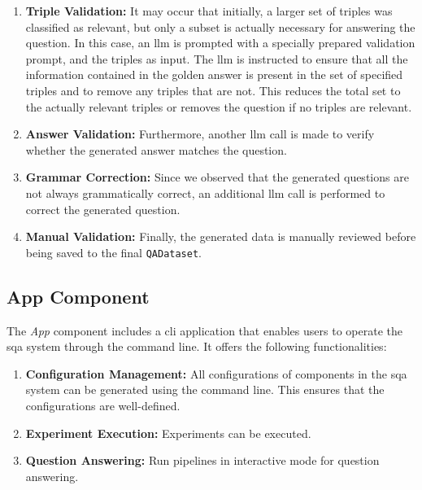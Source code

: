\begin{enumerate}
    \item \textbf{Triple Validation:} It may occur that initially, a larger set of triples was classified as relevant, but only a subset is actually necessary for answering the question. In this case, an \gls{llm} is prompted with a specially prepared validation prompt, and the triples as input. The \gls{llm} is instructed to ensure that all the information contained in the golden answer is present in the set of specified triples and to remove any triples that are not. This reduces the total set to the actually relevant triples or removes the question if no triples are relevant.
    
    \item \textbf{Answer Validation:} Furthermore, another \gls{llm} call is made to verify whether the generated answer matches the question.
    
    \item \textbf{Grammar Correction:} Since we observed that the generated questions are not always grammatically correct, an additional \gls{llm} call is performed to correct the generated question.
    
    \item \textbf{Manual Validation:} Finally, the generated data is manually reviewed before being saved to the final \texttt{QADataset}.
\end{enumerate}

\subsection{App Component}

The \emph{App} component includes a \gls{cli} application that enables users to operate the \gls{sqa} system through the command line. It offers the following functionalities:

\begin{enumerate}
    \item \textbf{Configuration Management:} All configurations of components in the \gls{sqa} system can be generated using the command line. This ensures that the configurations are well-defined.
    \item \textbf{Experiment Execution:} Experiments can be executed.
    \item \textbf{Question Answering:} Run pipelines in interactive mode for question answering.
\end{enumerate}


